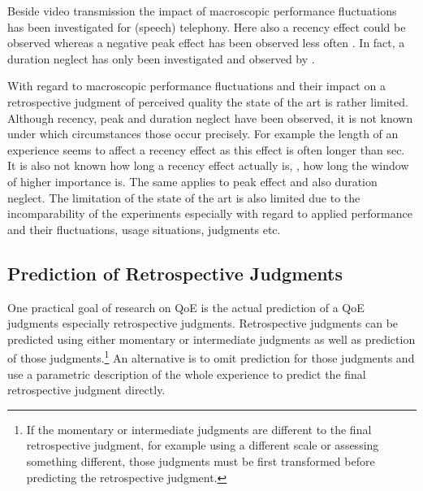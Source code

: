 Beside video transmission the impact of macroscopic performance fluctuations has been investigated for (speech) telephony. %
Here also a recency effect could be observed \citep[\cf,][]{rosenbluth_testing_1998, hamberg_time-varying_1999, gros_instantaneous_2001, gros_effects_2004, belmudez_assessment_2014, weiss_modeling_2009, lewcio_management_2012} whereas a negative peak effect has been observed less often \citep{weiss_modeling_2009, belmudez_assessment_2014, lewcio_management_2012}.
In fact, a duration neglect has only been investigated and observed by \citet{rosenbluth_testing_1998}.

With regard to macroscopic performance fluctuations and their impact on a retrospective judgment of perceived quality the state of the art is rather limited.
Although recency, peak and duration neglect have been observed, it is not known under which circumstances those occur precisely.
For example the length of an experience seems to affect a recency effect as this effect is often longer than \unit[30]{sec}.
It is also not known how long a recency effect actually is, \ie, how long the window of higher importance is.
The same applies to peak effect and also duration neglect.
The limitation of the state of the art is also limited due to the incomparability of the experiments especially with regard to applied performance and their fluctuations, usage situations, judgments etc.


\subsection{Prediction of Retrospective Judgments}
One practical goal of research on \ac{QoE} is the actual prediction of a \ac{QoE} judgments especially retrospective judgments.
Retrospective judgments can be predicted using either momentary or intermediate judgments as well as prediction of those judgments.\footnote{If the momentary or intermediate judgments are different to the final retrospective judgment, for example using a different scale or assessing something different, those judgments must be first transformed before predicting the retrospective judgment.}
An alternative is to omit prediction for those judgments and use a parametric description of the whole experience to predict the final retrospective judgment directly.

